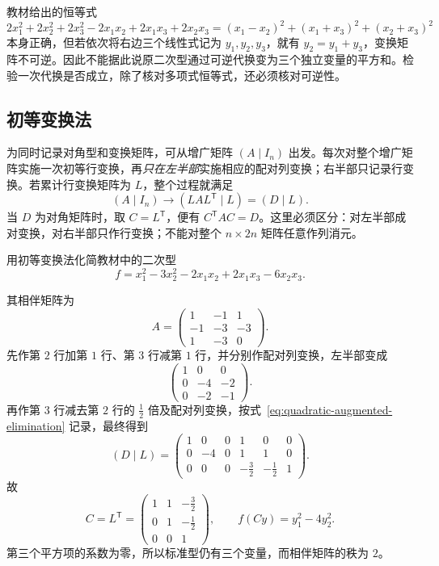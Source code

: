 \begin{notealert}[type=caution,title={平方和恒等式不一定给出可逆代换}]
教材给出的恒等式
\[
    2x_1^2+2x_2^2+2x_3^2-2x_1x_2+2x_1x_3+2x_2x_3
    =(x_1-x_2)^2+(x_1+x_3)^2+(x_2+x_3)^2
\]
本身正确，但若依次将右边三个线性式记为 $y_1,y_2,y_3$，就有 $y_2=y_1+y_3$，变换矩阵不可逆。因此不能据此说原二次型通过可逆代换变为三个独立变量的平方和。检验一次代换是否成立，除了核对多项式恒等式，还必须核对可逆性。
\end{notealert}

\subsection{初等变换法}

为同时记录对角型和变换矩阵，可从增广矩阵 $(A\mid I_n)$ 出发。每次对整个增广矩阵实施一次初等行变换，再\emph{只在左半部}实施相应的配对列变换；右半部只记录行变换。若累计行变换矩阵为 $L$，整个过程就满足
\begin{equation}
\label{eq:quadratic-augmented-elimination}
    (A\mid I_n)\longrightarrow(LAL^{\mathsf T}\mid L)
      =(D\mid L).
\end{equation}
当 $D$ 为对角矩阵时，取 $C=L^{\mathsf T}$，便有 $C^{\mathsf T}AC=D$。这里必须区分：对左半部成对变换，对右半部只作行变换；不能对整个 $n\times2n$ 矩阵任意作列消元。

\begin{example}
\label{ex:quadratic-elementary-reduction}
用初等变换法化简教材中的二次型
\[
    f=x_1^2-3x_2^2-2x_1x_2+2x_1x_3-6x_2x_3.
\]
\end{example}
\begin{solve}
其相伴矩阵为
\[
    A=\begin{pmatrix}1&-1&1\\-1&-3&-3\\1&-3&0\end{pmatrix}.
\]
先作第 $2$ 行加第 $1$ 行、第 $3$ 行减第 $1$ 行，并分别作配对列变换，左半部变成
\[
    \begin{pmatrix}1&0&0\\0&-4&-2\\0&-2&-1\end{pmatrix}.
\]
再作第 $3$ 行减去第 $2$ 行的 $\frac12$ 倍及配对列变换，按式~\eqref{eq:quadratic-augmented-elimination} 记录，最终得到
\[
    (D\mid L)=
    \left(\begin{array}{ccc|ccc}
        1&0&0&1&0&0\\
        0&-4&0&1&1&0\\
        0&0&0&-\frac32&-\frac12&1
    \end{array}\right).
\]
故
\[
    C=L^{\mathsf T}=
    \begin{pmatrix}1&1&-\frac32\\0&1&-\frac12\\0&0&1\end{pmatrix},
    \qquad f(Cy)=y_1^2-4y_2^2.
\]
第三个平方项的系数为零，所以标准型仍有三个变量，而相伴矩阵的秩为 $2$。
\end{solve}

